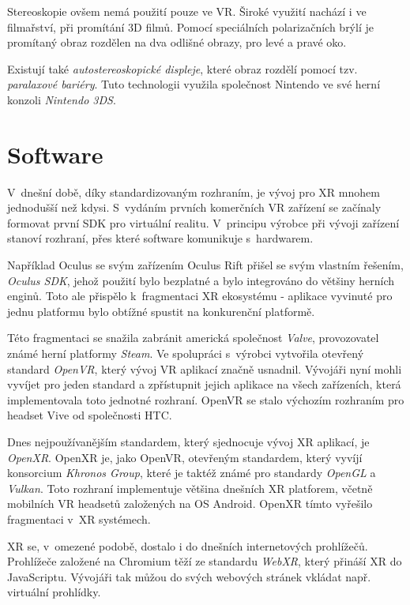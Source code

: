 Stereoskopie ovšem nemá použití pouze ve VR. Široké využití nachází i ve filmařství, při promítání 3D filmů. Pomocí speciálních polarizačních brýlí je promítaný obraz rozdělen na dva odlišné obrazy, pro levé a pravé oko. \cite{unitedfilm_stereoskopie}

Existují také \textit{autostereoskopické displeje}, které obraz rozdělí pomocí tzv. \textit{paralaxové bariéry}. Tuto technologii využila společnost Nintendo ve své herní konzoli \textit{Nintendo 3DS}. \cite{enwiki:1158939127}

\chapter{Software}

V~dnešní době, díky standardizovaným rozhraním, je vývoj pro XR mnohem jednodušší než kdysi. S~vydáním prvních komerčních VR zařízení se začínaly formovat první \gls{SDK} pro virtuální realitu. V~principu výrobce při vývoji zařízení stanoví rozhraní, přes které software komunikuje s~hardwarem. 

Například Oculus se svým zařízením Oculus Rift přišel se svým vlastním řešením, \textit{Oculus SDK}, jehož použití bylo bezplatné a bylo integrováno do většiny herních enginů. \cite{enwiki:1193283032} Toto ale přispělo k~fragmentaci XR ekosystému - aplikace vyvinuté pro jednu platformu bylo obtížné spustit na konkurenční platformě.

Této fragmentaci se snažila zabránit americká společnost \textit{Valve}, provozovatel známé herní platformy \textit{Steam}. Ve spolupráci s~výrobci vytvořila otevřený standard \textit{OpenVR}, který vývoj VR aplikací značně usnadnil. Vývojáři nyní mohli vyvíjet pro jeden standard a zpřístupnit jejich aplikace na všech zařízeních, která implementovala toto jednotné rozhraní. OpenVR se stalo výchozím rozhraním pro headset Vive od společnosti HTC. \cite{enwiki:1192992480}

Dnes nejpoužívanějším standardem, který sjednocuje vývoj XR aplikací, je \textit{OpenXR}. OpenXR je, jako OpenVR, otevřeným standardem, který vyvíjí konsorcium \textit{Khronos Group}, které je taktéž známé pro standardy \textit{OpenGL} a \textit{Vulkan}. Toto rozhraní implementuje většina dnešních XR platforem, včetně mobilních VR headsetů založených na OS Android. OpenXR tímto vyřešilo fragmentaci v~XR systémech. \cite{enwiki:1186405367}

XR se, v~omezené podobě, dostalo i do dnešních internetových prohlížečů. Prohlížeče založené na Chromium těží ze standardu \textit{WebXR}, který přináší XR do JavaScriptu. Vývojáři tak můžou do svých webových stránek vkládat např. virtuální prohlídky. \cite{webxr_mdn}

